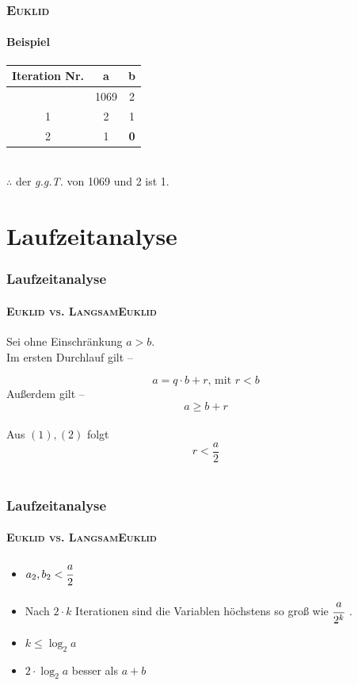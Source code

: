 \documentclass[•]{beamer}
\begin{document}
\begin{frame}
\frametitle{\textsc{Euklid}}
\framesubtitle{Beispiel}
\pause
\begin{tabular}{|c|c|c|} \hline
	Iteration Nr.& a & b \\ \hline
	& 1069 & 2 \pause \\ \hline
	1 & 2 & 1 \pause \\ \hline
	2 & 1 & \textbf{0} \pause \\ \hline \hline
	\end{tabular}\\ \vspace{5pt}
	$\therefore$ der \textit{g.g.T.} von 1069 und 2 ist 1.

\end{frame}

\section{Laufzeitanalyse}

\begin{frame}
	\frametitle{Laufzeitanalyse}
	\framesubtitle{\textsc{Euklid vs. LangsamEuklid}}
	Sei ohne Einschr\"ankung $a>b$.\pause \\ Im ersten Durchlauf gilt --
	
	\begin{equation}a = q \cdot b + r \text{, mit } r < b
	\end{equation}
	\pause 
	 Au{\ss}erdem gilt -- \\ \begin{equation}a \geq b + r \end{equation} \\
	 \pause 
	 Aus $(1), (2)$ folgt $$r < \frac{a}{2}$$ \\
\end{frame}	
\begin{frame}
	\frametitle{Laufzeitanalyse}
	\framesubtitle{\textsc{Euklid vs. LangsamEuklid}}
	\begin{itemize}
	\item $a_{2}, b_{2} < \cfrac{a}{2}$ \vspace*{10pt}
	\pause 
	\item Nach $2 \cdot k$ Iterationen sind die Variablen h\"ochstens so gro{\ss} wie $\cfrac{a}{2^k}$ \vspace{15pt} .	
	\pause 
	\item $k \leq \log_{2}a$
	\pause 
	\item $2\cdot \log_{2}a$ besser als $a+b$
	\end{itemize}
\end{frame}
\end{document}
